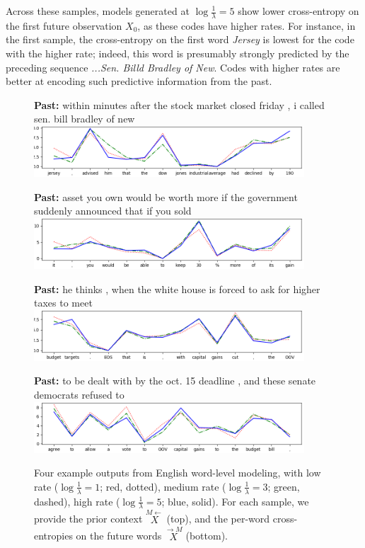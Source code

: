 \documentclass[entropy,article,submit,moreauthors,pdftex,10pt,a4paper]{Definitions/mdpi}
\newcommand{\finitefuture}{\stackrel{\rightarrow \scriptscriptstyle{M}}{X}}
\newcommand{\finitepast}{\stackrel{\scriptscriptstyle{M}\leftarrow}{X}}%
\begin{document}
Across these samples, models generated at $\log \frac{1}{\lambda} = 5$ show lower cross-entropy on the first future observation $X_0$, as these codes have higher rates.
For instance, in the first sample, the cross-entropy on the first word \emph{Jersey} is lowest for the code with the higher rate; indeed, this word is presumably strongly predicted by the preceding sequence \emph{...Sen. Billd Bradley of New}.
Codes with higher rates are better at encoding such predictive information from the past. 


\begin{figure}
\centering
\textbf{Past:} within minutes after the stock market closed friday , i called sen. bill bradley of new
\includegraphics[width=0.9\textwidth]{code/nprd/figures/sample_0.png}


\textbf{Past:} asset you own would be worth more if the government suddenly announced that if you sold
\includegraphics[width=0.9\textwidth]{code/nprd/figures/sample_20.png}

\textbf{Past:} he thinks , when the white house is forced to ask for higher taxes to meet
\includegraphics[width=0.9\textwidth]{code/nprd/figures/sample_31.png}

\textbf{Past:} to be dealt with by the oct. 15 deadline , and these senate democrats refused to
\includegraphics[width=0.9\textwidth]{code/nprd/figures/sample_6.png}

	\caption{Four example outputs from English word-level modeling, with low rate ($\log \frac{1}{\lambda} = 1$; red, dotted), medium rate ($\log \frac{1}{\lambda} = 3$; green, dashed), high rate ($\log \frac{1}{\lambda} = 5$; blue, solid). For each sample, we provide the prior context $\finitepast$ (top), and the per-word cross-entropies on the future words $\finitefuture$ (bottom).
	}\label{fig:samples-ptb}
\end{figure}
\end{document}
